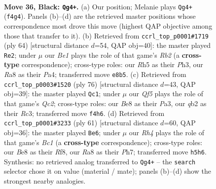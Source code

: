\documentclass[11pt]{article}
\begin{document}
\clearpage

\begin{figure}[p]\centering
\begin{subfigure}{0.46\textwidth}\centering
\resizebox{\linewidth}{!}{%
\newchessgame
\chessboard[
  setfen={r3b1k1/p4pP1/8/p6r/4pq2/PP6/1Q3PK1/3RR3 b - - 3 36},
  showmover=false,
  pgfstyle=straightmove, color=movearrow, markmove={f4-g4}
]}
\caption{}
\end{subfigure}\hfill
\begin{subfigure}{0.46\textwidth}\centering
\resizebox{\linewidth}{!}{%
\newchessgame
\chessboard[
  setfen={8/2q1rp1k/6pp/p1p1P3/P3Q3/2P4P/1R4P1/6K1 w - - 0 33},
  showmover=false,
  pgfstyle=straightmove, color=movearrow, markmove={b2-e2}
]}
\caption{}
\end{subfigure}
\\[4pt]
\begin{subfigure}{0.46\textwidth}\centering
\resizebox{\linewidth}{!}{%
\newchessgame
\chessboard[
  setfen={5k2/5p2/2r4p/p1Pq2p1/4p3/P1R3PP/2Q2P2/6K1 w - - 6 39},
  showmover=false,
  pgfstyle=straightmove, color=movearrow, markmove={c2-c1}
]}
\caption{}
\end{subfigure}\hfill
\begin{subfigure}{0.46\textwidth}\centering
\resizebox{\linewidth}{!}{%
\newchessgame
\chessboard[
  setfen={2b2rk1/4qppp/8/8/pp3R2/7P/1PP2QP1/1K1R4 b - - 3 31},
  showmover=false,
  pgfstyle=straightmove, color=movearrow, markmove={c8-e6}
]}
\caption{}
\end{subfigure}
\caption{\textbf{Move 36, Black: \texttt{Qg4+}.} (a) Our position; Melanie plays \texttt{Qg4+} (\texttt{f4g4}). Panels (b)--(d) are the retrieved master positions whose correspondence most drove this move (highest QAP objective among those that transfer to it). (b) Retrieved from \texttt{ccrl\_top\_p0001\#1719} (ply 64) [structural distance $d$=54, QAP obj=40]: the master played \texttt{Re2}; under $\mu$ our \emph{Be1} plays the role of that game's \emph{Rb2} (a \textbf{cross-type} correspondence); cross-type roles: our \emph{R}h5 as their \emph{P}h3, our \emph{R}a8 as their \emph{P}a4; transferred move \texttt{e8b5}. (c) Retrieved from \texttt{ccrl\_top\_p0003\#1520} (ply 76) [structural distance $d$=43, QAP obj=39]: the master played \texttt{Qc1}; under $\mu$ our \emph{Qf5} plays the role of that game's \emph{Qc2}; cross-type roles: our \emph{B}e8 as their \emph{P}a3, our \emph{q}b2 as their \emph{R}c3; transferred move \texttt{f4h6}. (d) Retrieved from \texttt{ccrl\_top\_p0001\#3233} (ply 61) [structural distance $d$=60, QAP obj=36]: the master played \texttt{Be6}; under $\mu$ our \emph{Rh4} plays the role of that game's \emph{Bc1} (a \textbf{cross-type} correspondence); cross-type roles: our \emph{B}e8 as their \emph{R}f8, our \emph{R}a8 as their \emph{P}h7; transferred move \texttt{h5h6}. Synthesis: no retrieved analog transferred to \texttt{Qg4+} -- the \texttt{search} selector chose it on value (material / mate); panels (b)--(d) show the strongest nearby analogies.}
\label{fig:thought-m71}
\end{figure}
\end{document}

